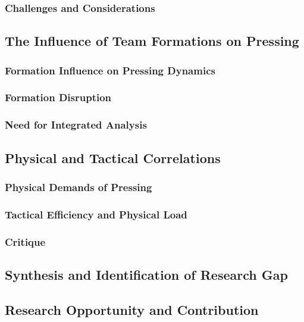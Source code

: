 \documentclass[12pt]{article}
\begin{document}
\subsubsection{Challenges and Considerations}


\subsection{The Influence of Team Formations on Pressing}


\subsubsection{Formation Influence on Pressing Dynamics}


\subsubsection{Formation Disruption}


\subsubsection{Need for Integrated Analysis}


\subsection{Physical and Tactical Correlations}


\subsubsection{Physical Demands of Pressing}


\subsubsection{Tactical Efficiency and Physical Load}


\subsubsection{Critique}




\subsection{Synthesis and Identification of Research Gap}





\subsection{Research Opportunity and Contribution}



\end{document}
